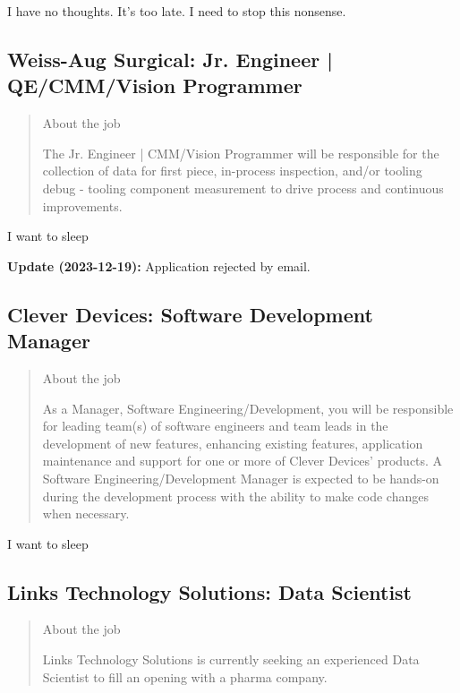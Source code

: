 \documentclass[
	letterpaper, %
	12pt, %
]{CSSullivanBusinessReport}
\begin{document}
I have no thoughts. It's too late. I need to stop this nonsense. 


\subsection[Weiss-Aug Surgical]{Weiss-Aug Surgical: Jr. Engineer | QE/CMM/Vision Programmer}

\begin{quote}
	About the job
	
	The Jr. Engineer | CMM/Vision Programmer will be responsible for the collection of data for first piece, in-process inspection, and/or tooling debug - tooling component measurement to drive process and continuous improvements.

\end{quote}

I want to sleep

\textbf{Update (2023-12-19):} Application rejected by email.


\subsection[Clever Devices]{Clever Devices: Software Development Manager}

\begin{quote}
	About the job
	
	As a Manager, Software Engineering/Development, you will be responsible for leading team(s) of software engineers and team leads in the development of new features, enhancing existing features, application maintenance and support for one or more of Clever Devices’ products. A Software Engineering/Development Manager is expected to be hands-on during the development process with the ability to make code changes when necessary.

\end{quote}

I want to sleep


\subsection[Links Technology Solutions]{Links Technology Solutions: Data Scientist}

\begin{quote}
	About the job
	
	Links Technology Solutions is currently seeking an experienced Data Scientist to fill an opening with a pharma company.

\end{quote}
\end{document}
